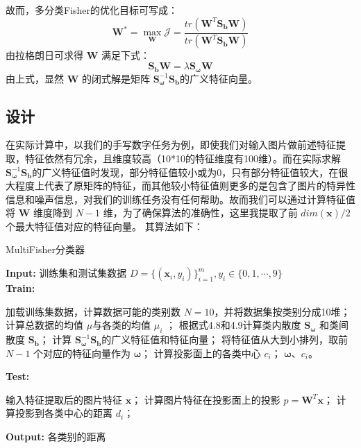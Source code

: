 \documentclass[UTF8, a4paper, 12pt]{report}
\begin{document}
			故而，多分类Fisher的优化目标可写成：
			\begin{equation}
				\bm{W} ^* = \max_{\bm{W}} \mathcal{J} = \frac{tr(\bm{W}^T \bm{S}_{\bm{b}} \bm{W})}{tr(\bm{W}^T \bm{S}_{\bm{b}} \bm{W})}
			\end{equation}
由拉格朗日可求得 $\bm{W}$ 满足下式：
			\begin{equation}
				\bm{S}_{\bm{b}} \bm{W} = \lambda \bm{S}_{\bm{\omega}} \bm{W}
			\end{equation}
由上式，显然 $\bm{W}$ 的闭式解是矩阵 $\bm{S}_{\bm{\omega}}^{-1} \bm{S}_{\bm{b}}$的广义特征向量。
		\subsection{设计}
			在实际计算中，以我们的手写数字任务为例，即使我们对输入图片做前述特征提取，特征依然有冗余，且维度较高（10*10的特征维度有100维）。而在实际求解 $\bm{S}_{\bm{\omega}}^{-1} \bm{S}_{\bm{b}}$的广义特征值时发现，部分特征值较小或为0，只有部分特征值较大，在很大程度上代表了原矩阵的特征，而其他较小特征值则更多的是包含了图片的特异性信息和噪声信息，对我们的训练任务没有任何帮助。故而我们可以通过计算特征值将 $\bm{W}$ 维度降到 $N-1$ 维，为了确保算法的准确性，这里我提取了前 $dim(\bm{x})/2$个最大特征值对应的特征向量。 其算法如下：
			\begin{algorithm}
			\caption{MultiFisher分类器} %
			\hspace*{0.02in} {\bf Input:} %
			训练集和测试集数据 $D=\{(\bm{x}_i, y_i)\}_{i=1}^{m}, y_i \in \{0, 1, \cdots, 9\}$ \\
			\hspace*{0.02in} {\bf Train:}
			\begin{algorithmic}[1]
			\State 加载训练集数据，计算数据可能的类别数 $N=10$，并将数据集按类别分成10堆； %
			\State 计算总数据的均值 $\mu$与各类的均值 $\mu_i$ ；
			\State 根据式4.8和4.9计算类内散度 $\bm{S}_{\bm{\omega}}$ 和类间散度 $\bm{S}_{\bm{b}}$；
			\State 计算 $\bm{S}_{\bm{\omega}}^{-1} \bm{S}_{\bm{b}}$的广义特征值和特征向量；
			\State 将特征值从大到小排列，取前 $N-1$ 个对应的特征向量作为  $\bm{\omega}$；
			\State 计算投影面上的各类中心 $c_i$；
			\State \Return   $\bm{\omega}$、$c_i$。
			\end{algorithmic}
			\hspace*{0.02in} {\bf Test:}
			\begin{algorithmic}[1]
			\State 输入特征提取后的图片特征 $\bm{x}$；
			\State 计算图片特征在投影面上的投影 $p = \bm{W}^T \bm{x}$；
			\State 计算投影到各类中心的距离 $d_i$；
			\end{algorithmic}
			\hspace*{0.02in} {\bf Output:} %
			各类别的距离
			\end{algorithm}
\end{document}
